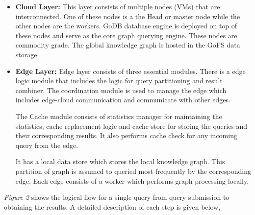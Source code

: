 \documentclass[conference]{IEEEtran}
\begin{document}
\begin{itemize}%
	\item \textbf{Cloud Layer:} This layer consists of multiple nodes (VMs) that are interconnected. One of these nodes is a the Head or master node while the other nodes are the workers. GoDB database engine is deployed on top of these nodes and serve as the core graph querying engine. These nodes are commodity grade. The global knowledge graph is hosted in the GoFS data storage
	\item \textbf{Edge Layer: }	Edge layer consists of three essential modules. There is a edge logic module that includes the logic for query partitioning and result combiner. The coordination module is used to manage the edge which includes edge-cloud communication and communicate with other edges.
	
	The Cache module consists of statistics manager for maintaining the statistics, cache replacement logic and cache store for storing the queries and their corresponding results. It also performs cache check for any incoming query from the edge.
	
	It has a local data store which stores the local knowledge graph. This partition of graph is assumed to queried most frequently by the corresponding edge. Each edge consists of a worker which performs graph processing locally. 
\end{itemize}

\emph{Figure 2} shows the logical flow for a single query from query submission to obtaining the results. A detailed description of each step is given below,
\end{document}
